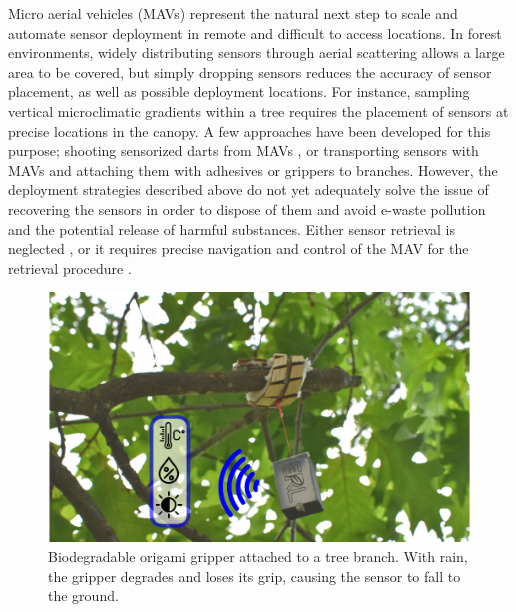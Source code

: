 Micro aerial vehicles (MAVs) represent the natural next step to scale and automate sensor deployment in remote and difficult to access locations.
In forest environments, widely distributing sensors through aerial scattering \cite{Pounds2015, Iyer2022} allows a large area to be covered, but simply dropping sensors reduces the accuracy of sensor placement, as well as possible deployment locations. For instance, sampling vertical microclimatic gradients within a tree requires the placement of sensors at precise locations in the canopy. A few approaches have been developed for this purpose; shooting sensorized darts from MAVs \cite{Farinha2020}, or transporting sensors with MAVs and attaching them with adhesives \cite{Hamaza2019} or grippers \cite{Geckeler2022a} to branches. However, the deployment strategies described above do not yet adequately solve the issue of recovering the sensors in order to dispose of them and avoid e-waste pollution and the potential release of harmful substances. Either sensor retrieval is neglected \cite{Pounds2015,Farinha2020}, or it requires precise navigation and control of the MAV for the retrieval procedure \cite{Hamaza2019, Geckeler2022a}.

\begin{figure}[!t]
\centering
\includegraphics[width=1\columnwidth]{chapters/papers/BOG/figures/figure1-overview/figure1-overview.pdf}
\caption{Biodegradable origami gripper attached to a tree branch. With rain, the gripper degrades and loses its grip, causing the sensor to fall to the ground.}
\label{fig1_overview_intro}
\end{figure}


